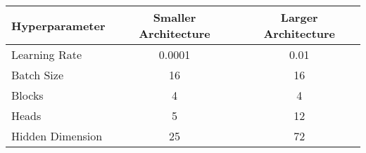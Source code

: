 \begin{tabular}{lcc}
	\toprule
    \textbf{Hyperparameter} & \textbf{Smaller Architecture} & \textbf{Larger Architecture} \\
    \midrule
    Learning Rate & 0.0001 & 0.01 \\ 
    \midrule
    Batch Size & 16 & 16 \\
    \midrule
    Blocks & 4 & 4 \\
    Heads & 5 & 12 \\
    Hidden Dimension & 25 & 72 \\
    \bottomrule
\end{tabular}
